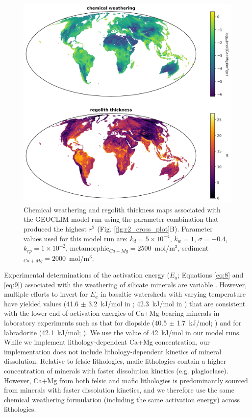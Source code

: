 \documentclass[11pt,letterpaper]{article}
\begin{document}
\begin{figure}[h!]
    \centering
    \includegraphics[width=1\textwidth]{Manuscript/Figures/weathering_regolith_maps.jpg}
    \caption{Chemical weathering and regolith thickness maps associated with the GEOCLIM model run using the parameter combination that produced the highest $r^{2}$ (Fig. \ref{fig:r2_cross_plot}B). Parameter values used for this model run are: $k_{d}=5\times10^{-4}$, $k_{w}=1$, $\sigma=-0.4$, $k_{rp}=1\times10^{-2}$, metamorphic$_{Ca+Mg}=2500$~mol/m$^{3}$, sediment$_{Ca+Mg}=2000$~mol/m$^{3}$.}
    \label{fig:weathering_regolith_maps}
\end{figure}

Experimental determinations of the activation energy ($E_a$; Equations \ref{eq:8} and \ref{eq:9}) associated with the weathering of silicate minerals are variable \citep{Brantley2003a}. However, multiple efforts to invert for $E_a$ in basaltic watersheds with varying temperature have yielded values (41.6 $\pm$ 3.2~kJ/mol in \citealp{Li2016a}; 42.3~kJ/mol in \citealp{Dessert2001a}) that are consistent with the lower end of activation energies of Ca+Mg bearing minerals in laboratory experiments such as that for diopside (40.5 $\pm$ 1.7~kJ/mol; \citealp{Knauss1993a}) and for labradorite (42.1~kJ/mol; \citealp{Carroll2005a}). We use the value of 42~kJ/mol in our model runs. While we implement lithology-dependent Ca+Mg concentration, our implementation does not include lithology-dependent kinetics of mineral dissolution. Relative to felsic lithologies, mafic lithologies contain a higher concentration of minerals with faster dissolution kinetics (e.g. plagioclase). However, Ca+Mg from both felsic and mafic lithologies is predominantly sourced from minerals with faster dissolution kinetics, and we therefore use the same chemical weathering formulation (including the same activation energy) across lithologies.
\end{document}
